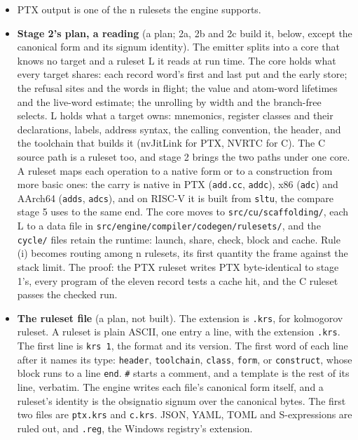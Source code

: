 \begin{enumerate}
\begin{itemize}
\begin{enumerate}
\begin{itemize}
\item PTX output is one of the n rulesets the engine supports.
\item \textbf{Stage 2's plan, a reading} (a plan; 2a, 2b and 2c build it, below, except the canonical form and its signum identity). The emitter splits into a core that knows no target and a ruleset L it reads at run time. The core holds what every target shares: each record word's first and last put and the early store; the refusal sites and the words in flight; the value and atom-word lifetimes and the live-word estimate; the unrolling by width and the branch-free selects. L holds what a target owns: mnemonics, register classes and their declarations, labels, address syntax, the calling convention, the header, and the toolchain that builds it (nvJitLink for PTX, NVRTC for C). The C source path is a ruleset too, and stage 2 brings the two paths under one core. A ruleset maps each operation to a native form or to a construction from more basic ones: the carry is native in PTX (\texttt{add.\allowbreak{}cc}, \texttt{addc}), x86 (\texttt{adc}) and AArch64 (\texttt{adds}, \texttt{adcs}), and on RISC-V it is built from \texttt{sltu}, the compare stage 5 uses to the same end. The core moves to \texttt{src/\allowbreak{}cu/\allowbreak{}scaffolding/\allowbreak{}}, each L to a data file in \texttt{src/\allowbreak{}engine/\allowbreak{}compiler/\allowbreak{}codegen/\allowbreak{}rulesets/\allowbreak{}}, and the \texttt{cycle/\allowbreak{}} files retain the runtime: launch, share, check, block and cache. Rule (i) becomes routing among n rulesets, its first quantity the frame against the stack limit. The proof: the PTX ruleset writes PTX byte-identical to stage 1's, every program of the eleven record tests a cache hit, and the C ruleset passes the checked run.
\item \textbf{The ruleset file} (a plan, not built). The extension is \texttt{.\allowbreak{}krs}, for kolmogorov ruleset. A ruleset is plain ASCII, one entry a line, with the extension \texttt{.\allowbreak{}krs}. The first line is \texttt{krs 1}, the format and its version. The first word of each line after it names its type: \texttt{header}, \texttt{toolchain}, \texttt{class}, \texttt{form}, or \texttt{construct}, whose block runs to a line \texttt{end}. \texttt{\#} starts a comment, and a template is the rest of its line, verbatim. The engine writes each file's canonical form itself, and a ruleset's identity is the obsignatio signum over the canonical bytes. The first two files are \texttt{ptx.\allowbreak{}krs} and \texttt{c.\allowbreak{}krs}. JSON, YAML, TOML and S-expressions are ruled out, and \texttt{.\allowbreak{}reg}, the Windows registry's extension.

\end{itemize}
\end{enumerate}
\end{itemize}
\end{enumerate}
